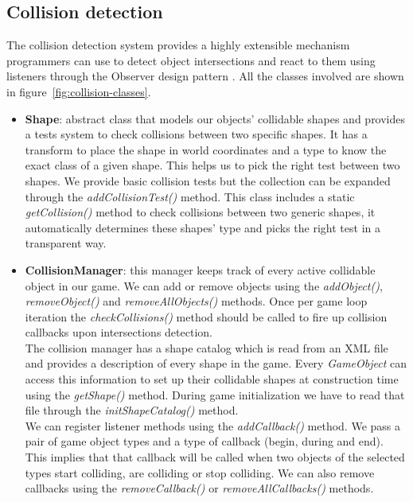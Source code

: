 \subsection{Collision detection}

The collision detection system provides a highly extensible mechanism
programmers can use to detect object intersections and react to them
using listeners through the Observer design pattern \cite{gamm94}. All
the classes involved are shown in figure~\ref{fig:collision-classes}.


\begin{itemize}
	\item \textbf{Shape}: abstract class that models our objects' collidable shapes and provides a tests system to
	check collisions between two specific shapes. It has a transform to place the shape in world coordinates and
	a type to know the exact class of a given shape. This helps us to pick the right test between two shapes. We
	provide basic collision tests but the collection can be expanded through the \textit{addCollisionTest()} method. This
	class includes a static \textit{getCollision()} method to check collisions between two generic shapes,
	it automatically determines these shapes' type and picks the right test in a transparent way.
	
	\item \textbf{CollisionManager}: this manager keeps track of every active collidable object in our game. We can
	add or remove objects using the \textit{addObject()}, \textit{removeObject()} and \textit{removeAllObjects()} methods.
	Once per game loop iteration the \textit{checkCollisions()} method should be called to fire up collision callbacks
	upon intersections detection.\\
	
	The collision manager has a shape catalog which is read from an XML file and provides a description of every
	shape in the game. Every \textit{GameObject} can access this information to set up their collidable shapes
	at construction time using the \textit{getShape()} method. During game initialization we have to read that
	file through the \textit{initShapeCatalog()} method.\\
	
	We can register listener methods using the \textit{addCallback()} method. We pass a pair of game object types
	and a type of callback (begin, during and end). This implies that that callback will be called when two
	objects of the selected types start colliding, are colliding or stop colliding. We can also remove callbacks
	using the \textit{removeCallback()} or \textit{removeAllCallbacks()} methods.
	

\end{itemize}
